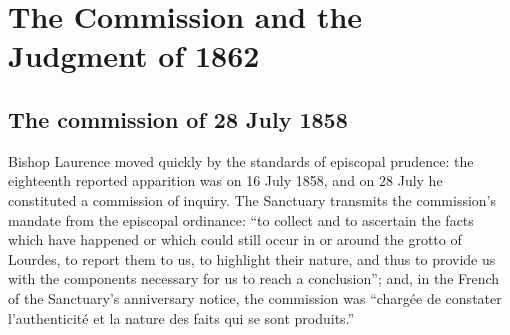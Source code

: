 \section{The Commission and the Judgment of 1862}

\subsection{The commission of 28 July 1858}

Bishop Laurence moved quickly by the standards of episcopal
prudence: the eighteenth reported apparition was on 16 July 1858,
and on 28 July he constituted a commission of inquiry. The
Sanctuary transmits the commission's mandate from the episcopal
ordinance: ``to collect and to ascertain the facts which have
happened or which could still occur in or around the grotto of
Lourdes, to report them to us, to highlight their nature, and thus
to provide us with the components necessary for us to reach a
conclusion''; and, in the French of the Sanctuary's anniversary
notice, the commission was ``charg\'ee de constater
l'authenticit\'e et la nature des faits qui se sont
produits.''

